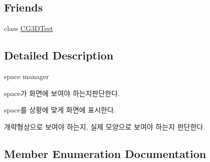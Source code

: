 \subsection*{Friends}
\begin{DoxyCompactItemize}
\item 
class \hyperlink{class_c_g_space_manager_a0066bb24d9976fa6f552be214b59e211}{C\+G3\+D\+Test}
\end{DoxyCompactItemize}


\subsection{Detailed Description}

\begin{DoxyItemize}
\item space manager
\item space가 화면에 보여야 하는지판단한다.
\item space를 상황에 맞게 화면에 표시한다.
\begin{DoxyItemize}
\item 개략형상으로 보여야 하는지, 실제 모양으로 보여야 하는지 판단한다. 
\end{DoxyItemize}
\end{DoxyItemize}

\subsection{Member Enumeration Documentation}
\hypertarget{class_c_g_space_manager_acd1d45e0cfa5fd251c6c17f61654fbef}{}
